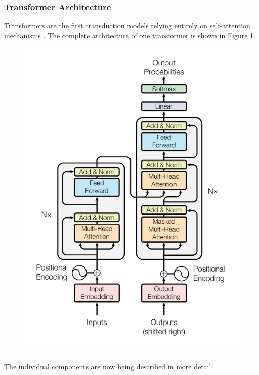 \subsubsection{Transformer Architecture}
\label{sec:transformer}
Transformers are the first transduction models relying entirely on self-attention mechanisms \cite{1706.03762}.
The complete architecture of one transformer is shown in Figure \ref{fig:transformer}.
\begin{figure}[h]
    \centering 
    \includegraphics [width=\linewidth]{resources/Transformer} \\
    \caption{\citet{1706.03762}}
    \label{fig:transformer}
\end{figure} \\
The individual components are now being described in more detail:
